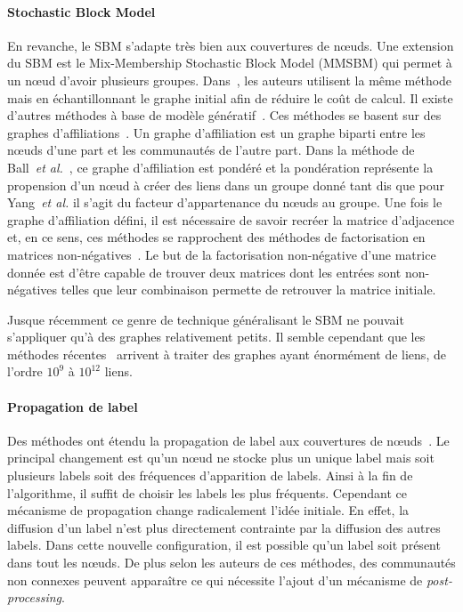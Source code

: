 \paragraph{Stochastic Block Model}
En revanche, le SBM s'adapte très bien aux couvertures de n\oe uds.
Une extension du SBM est le Mix-Membership Stochastic Block Model (MMSBM)\cite{Airoldi2008} qui permet à un n\oe ud d'avoir plusieurs groupes.
Dans~\cite{Gopalan2013a}, les auteurs utilisent la même méthode mais en échantillonnant le graphe initial afin de réduire le coût de calcul.
Il existe d'autres méthodes à base de modèle génératif~\cite{Ball2011,Yang2013}.
Ces méthodes se basent sur des graphes d'affiliations~\cite{BreigerRonald1974}.
Un graphe d'affiliation est un graphe biparti entre les n\oe uds d'une part et les communautés de l'autre part.
Dans la méthode de Ball~\emph{et al.}~\cite{Ball2011}, ce graphe d'affiliation est pondéré et la pondération représente la propension d'un n\oe ud à créer des liens dans un groupe donné tant dis que pour Yang~\emph{et al.} il s'agit du facteur d'appartenance du n\oe uds au groupe.
Une fois le graphe d'affiliation défini, il est nécessaire de savoir recréer la matrice d'adjacence et, en ce sens, ces méthodes se rapprochent des méthodes de factorisation en matrices non-négatives~\cite{Lee1999}.
Le but de la factorisation non-négative d'une matrice donnée est d'être capable de trouver deux matrices dont les entrées sont non-négatives telles que leur combinaison permette de retrouver la matrice initiale.

Jusque récemment ce genre de technique généralisant le SBM ne pouvait s'appliquer qu'à des graphes relativement petits.
Il semble cependant que les méthodes récentes~\cite{Gopalan2013a, Yang2013} arrivent à traiter des graphes ayant énormément de liens, de l'ordre $10^{9}$ à $10^{12}$ liens.



\paragraph{Propagation de label}
Des méthodes ont étendu la propagation de label aux couvertures de n\oe uds~\cite{Gregory2010,Xie2011}.
Le principal changement est qu'un n\oe ud ne stocke plus un unique label mais soit plusieurs labels soit des fréquences d'apparition de labels.
Ainsi à la fin de l'algorithme, il suffit de choisir les labels les plus fréquents.
Cependant ce mécanisme de propagation change radicalement l'idée initiale.
En effet, la diffusion d'un label n'est plus directement contrainte par la diffusion des autres labels.
Dans cette nouvelle configuration, il est possible qu'un label soit présent dans tout les n\oe uds.
De plus selon les auteurs de ces méthodes, des communautés non connexes peuvent apparaître ce qui nécessite l’ajout d’un mécanisme de \emph{post-processing}.


